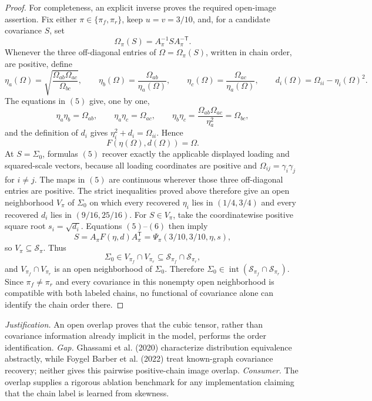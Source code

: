 \documentclass{article}
\begin{document}
\begin{proof}
For completeness, an explicit inverse proves the required open-image assertion.  Fix either \(\pi\in\{\pi_f,\pi_r\}\), keep \(u=v=3/10\), and, for a candidate covariance \(S\), set
\[
 \Omega_\pi(S)=A_\pi^{-1}S A_\pi^{-\mathsf T}.
\]
Whenever the three off-diagonal entries of \(\Omega=\Omega_\pi(S)\), written in chain order, are positive, define
\[
 \eta_a(\Omega)=\sqrt{\frac{\Omega_{ab}\Omega_{ac}}{\Omega_{bc}}},
 \qquad
 \eta_b(\Omega)=\frac{\Omega_{ab}}{\eta_a(\Omega)},
 \qquad
 \eta_c(\Omega)=\frac{\Omega_{ac}}{\eta_a(\Omega)},
 \qquad
 d_i(\Omega)=\Omega_{ii}-\eta_i(\Omega)^2.
 \tag{5}
\]
The equations in \((5)\) give, one by one,
\[
 \eta_a\eta_b=\Omega_{ab},\qquad
 \eta_a\eta_c=\Omega_{ac},\qquad
 \eta_b\eta_c
 =\frac{\Omega_{ab}\Omega_{ac}}{\eta_a^2}
 =\Omega_{bc},
\]
and the definition of \(d_i\) gives \(\eta_i^2+d_i=\Omega_{ii}\).  Hence
\[
 F(\eta(\Omega),d(\Omega))=\Omega.
 \tag{6}
\]
At \(S=\Sigma_0\), formulas \((5)\) recover exactly the applicable displayed loading and squared-scale vectors, because all loading coordinates are positive and \(\Omega_{ij}=\gamma_i\gamma_j\) for \(i\ne j\).  The maps in \((5)\) are continuous wherever those three off-diagonal entries are positive.  The strict inequalities proved above therefore give an open neighborhood \(V_\pi\) of \(\Sigma_0\) on which every recovered \(\eta_i\) lies in \((1/4,3/4)\) and every recovered \(d_i\) lies in \((9/16,25/16)\).  For \(S\in V_\pi\), take the coordinatewise positive square root \(s_i=\sqrt{d_i}\).  Equations \((5)\)--\((6)\) then imply
\[
 S=A_\pi F(\eta,d)A_\pi^{\mathsf T}
 =\Psi_\pi(3/10,3/10,\eta,s),
\]
so \(V_\pi\subseteq\mathcal S_\pi\).  Thus
\[
 \Sigma_0\in V_{\pi_f}\cap V_{\pi_r}
 \subseteq\mathcal S_{\pi_f}\cap\mathcal S_{\pi_r},
\]
and \(V_{\pi_f}\cap V_{\pi_r}\) is an open neighborhood of \(\Sigma_0\).  Therefore \(\Sigma_0\in\operatorname{int}(\mathcal S_{\pi_f}\cap\mathcal S_{\pi_r})\).  Since \(\pi_f\ne\pi_r\) and every covariance in this nonempty open neighborhood is compatible with both labeled chains, no functional of covariance alone can identify the chain order there.
\end{proof}
\par\smallskip\noindent \textit{Justification.} An open overlap proves that the cubic tensor, rather than covariance information already implicit in the model, performs the order identification. \textit{Gap.} Ghassami et al. (2020) characterize distribution equivalence abstractly, while Foygel Barber et al. (2022) treat known-graph covariance recovery; neither gives this pairwise positive-chain image overlap. \textit{Consumer.} The overlap supplies a rigorous ablation benchmark for any implementation claiming that the chain label is learned from skewness.
\end{document}
